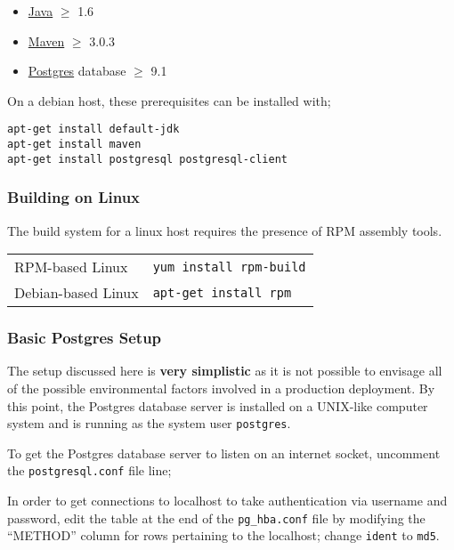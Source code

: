 \begin{itemize}
\item \href{https://community.java.net/open-jdk}{Java} $\geqslant$ 1.6
\item \href{http://maven.apache.org}{Maven} $\geqslant$ 3.0.3
\item \href{http://www.postgres.org}{Postgres} database $\geqslant$ 9.1
\end{itemize}

On a debian host, these prerequisites can be installed with;

\begin{verbatim}
apt-get install default-jdk
apt-get install maven
apt-get install postgresql postgresql-client
\end{verbatim}

\subsubsection{Building on Linux}
\label{prerequisites-buildingonlinux}

The build system for a linux host requires the presence of RPM assembly tools.

\begin{tabular}{|l|l|}
\hline
RPM-based Linux & {\tt yum install rpm-build} \\
Debian-based Linux & {\tt apt-get install rpm} \\
\hline
\end{tabular}

\subsubsection{Basic Postgres Setup}

The setup discussed here is {\bf very simplistic} as it is not possible to envisage all of the possible environmental factors involved in a production deployment.  By this point, the Postgres database server is  installed on a UNIX-like computer system and is running as the system user {\tt postgres}.

To get the Postgres database server to listen on an internet socket, uncomment the {\tt postgresql.conf} file line;


In order to get connections to localhost to take authentication via username and password, edit the table at the end of the {\tt pg\_hba.conf} file by modifying the ``METHOD'' column for rows pertaining to the localhost; change {\tt ident} to {\tt md5}.

